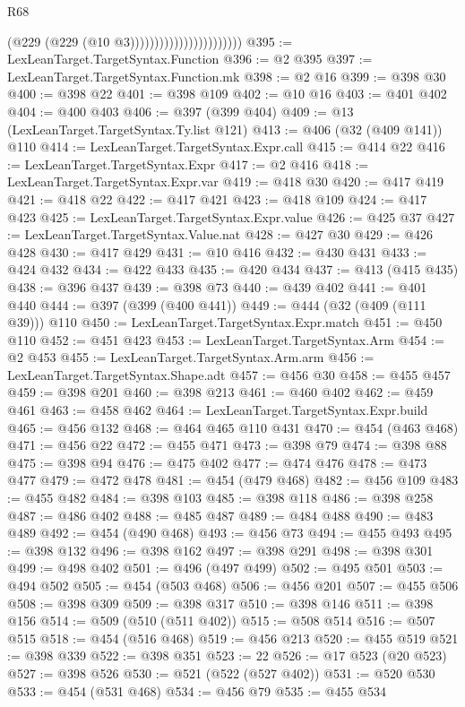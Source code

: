 \begin{lexlean}{R68}
\begin{coremodule}
                                            (@229 (@229 (@10 @3)))))))))))))))))))))))
@395 := LexLeanTarget.TargetSyntax.Function
@396 := @2 @395
@397 := LexLeanTarget.TargetSyntax.Function.mk
@398 := @2 @16
@399 := @398 @30
@400 := @398 @22
@401 := @398 @109
@402 := @10 @16
@403 := @401 @402
@404 := @400 @403
@406 := @397 (@399 @404)
@409 := @13 (LexLeanTarget.TargetSyntax.Ty.list @121)
@413 := @406 (@32 (@409 @141)) @110
@414 := LexLeanTarget.TargetSyntax.Expr.call
@415 := @414 @22
@416 := LexLeanTarget.TargetSyntax.Expr
@417 := @2 @416
@418 := LexLeanTarget.TargetSyntax.Expr.var
@419 := @418 @30
@420 := @417 @419
@421 := @418 @22
@422 := @417 @421
@423 := @418 @109
@424 := @417 @423
@425 := LexLeanTarget.TargetSyntax.Expr.value
@426 := @425 @37
@427 := LexLeanTarget.TargetSyntax.Value.nat
@428 := @427 @30
@429 := @426 @428
@430 := @417 @429
@431 := @10 @416
@432 := @430 @431
@433 := @424 @432
@434 := @422 @433
@435 := @420 @434
@437 := @413 (@415 @435)
@438 := @396 @437
@439 := @398 @73
@440 := @439 @402
@441 := @401 @440
@444 := @397 (@399 (@400 @441))
@449 := @444 (@32 (@409 (@111 @39))) @110
@450 := LexLeanTarget.TargetSyntax.Expr.match
@451 := @450 @110
@452 := @451 @423
@453 := LexLeanTarget.TargetSyntax.Arm
@454 := @2 @453
@455 := LexLeanTarget.TargetSyntax.Arm.arm
@456 := LexLeanTarget.TargetSyntax.Shape.adt
@457 := @456 @30
@458 := @455 @457
@459 := @398 @201
@460 := @398 @213
@461 := @460 @402
@462 := @459 @461
@463 := @458 @462
@464 := LexLeanTarget.TargetSyntax.Expr.build
@465 := @456 @132
@468 := @464 @465 @110 @431
@470 := @454 (@463 @468)
@471 := @456 @22
@472 := @455 @471
@473 := @398 @79
@474 := @398 @88
@475 := @398 @94
@476 := @475 @402
@477 := @474 @476
@478 := @473 @477
@479 := @472 @478
@481 := @454 (@479 @468)
@482 := @456 @109
@483 := @455 @482
@484 := @398 @103
@485 := @398 @118
@486 := @398 @258
@487 := @486 @402
@488 := @485 @487
@489 := @484 @488
@490 := @483 @489
@492 := @454 (@490 @468)
@493 := @456 @73
@494 := @455 @493
@495 := @398 @132
@496 := @398 @162
@497 := @398 @291
@498 := @398 @301
@499 := @498 @402
@501 := @496 (@497 @499)
@502 := @495 @501
@503 := @494 @502
@505 := @454 (@503 @468)
@506 := @456 @201
@507 := @455 @506
@508 := @398 @309
@509 := @398 @317
@510 := @398 @146
@511 := @398 @156
@514 := @509 (@510 (@511 @402))
@515 := @508 @514
@516 := @507 @515
@518 := @454 (@516 @468)
@519 := @456 @213
@520 := @455 @519
@521 := @398 @339
@522 := @398 @351
@523 := 22
@526 := @17 @523 (@20 @523)
@527 := @398 @526
@530 := @521 (@522 (@527 @402))
@531 := @520 @530
@533 := @454 (@531 @468)
@534 := @456 @79
@535 := @455 @534

\end{coremodule}
\end{lexlean}
